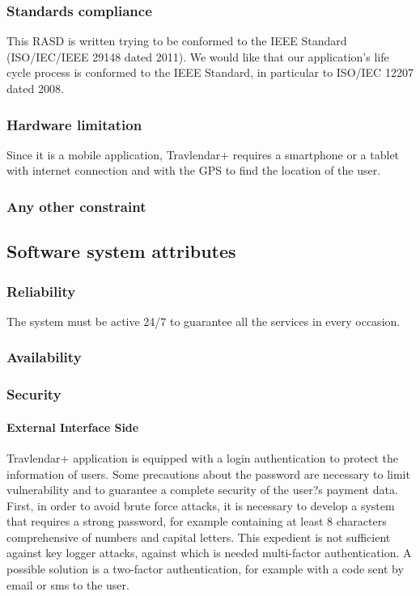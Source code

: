 \documentclass[12pt,titlepage]{article}
\begin{document}
\subsubsection{Standards compliance}\label{sec:mod1}
This RASD is written trying to be conformed to the IEEE Standard (ISO/IEC/IEEE 29148 dated 2011).
We would like that our application's life cycle process is conformed to the IEEE Standard, in particular to ISO/IEC 12207 dated 2008.

\subsubsection{Hardware limitation}\label{sec:mod1}
Since it is a mobile application, Travlendar+ requires a smartphone or a tablet with internet connection and with the GPS to find the location of the user. 

\subsubsection{Any other constraint}\label{sec:mod1}
\subsection{Software system attributes}\label{sec:mod1}
\subsubsection{Reliability}\label{sec:mod1}
The system must be active 24/7 to guarantee all the services in every occasion. 

\subsubsection{Availability}\label{sec:mod1}
\subsubsection{Security}\label{sec:mod1}
\paragraph{External Interface Side} 
Travlendar+ application is equipped with a login authentication to protect the information of users. Some precautions about the password are necessary to limit vulnerability and to guarantee a complete security of the user?s payment data. First, in order to avoid brute force attacks, it is necessary to develop a system that requires a strong password, for example containing at least 8 characters comprehensive of numbers and capital letters. This expedient is not sufficient against key logger attacks, against which is needed multi-factor authentication. A possible solution is a two-factor authentication, for example with a code sent by email or sms to the user. 
\end{document}
